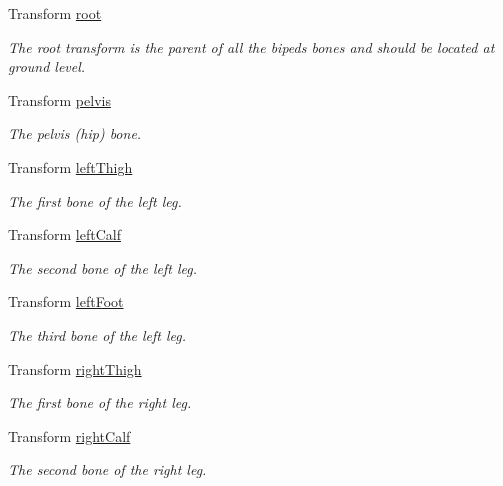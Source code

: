 \begin{DoxyCompactItemize}
\item 
Transform \mbox{\hyperlink{class_root_motion_1_1_biped_references_a9881cc2a81314b442244e08c5b7d62fc}{root}}
\begin{DoxyCompactList}\small\item\em The root transform is the parent of all the biped\textquotesingle{}s bones and should be located at ground level. \end{DoxyCompactList}\item 
Transform \mbox{\hyperlink{class_root_motion_1_1_biped_references_aaf12e0e58c4b3e635d3bc422f4efcd36}{pelvis}}
\begin{DoxyCompactList}\small\item\em The pelvis (hip) bone. \end{DoxyCompactList}\item 
Transform \mbox{\hyperlink{class_root_motion_1_1_biped_references_a88d891301bf912988dafb043b8619552}{left\+Thigh}}
\begin{DoxyCompactList}\small\item\em The first bone of the left leg. \end{DoxyCompactList}\item 
Transform \mbox{\hyperlink{class_root_motion_1_1_biped_references_a3bf14dbd168075a0b2b5a67e1ada02ca}{left\+Calf}}
\begin{DoxyCompactList}\small\item\em The second bone of the left leg. \end{DoxyCompactList}\item 
Transform \mbox{\hyperlink{class_root_motion_1_1_biped_references_abca1f57dc355f126238cf8ead478cd02}{left\+Foot}}
\begin{DoxyCompactList}\small\item\em The third bone of the left leg. \end{DoxyCompactList}\item 
Transform \mbox{\hyperlink{class_root_motion_1_1_biped_references_a74381fef16ab26ef3a4278539db84bf5}{right\+Thigh}}
\begin{DoxyCompactList}\small\item\em The first bone of the right leg. \end{DoxyCompactList}\item 
Transform \mbox{\hyperlink{class_root_motion_1_1_biped_references_a9ca831e7879d70d0ea221b9d7e47ab9d}{right\+Calf}}
\begin{DoxyCompactList}\small\item\em The second bone of the right leg. \end{DoxyCompactList}\item 

\end{DoxyCompactItemize}

